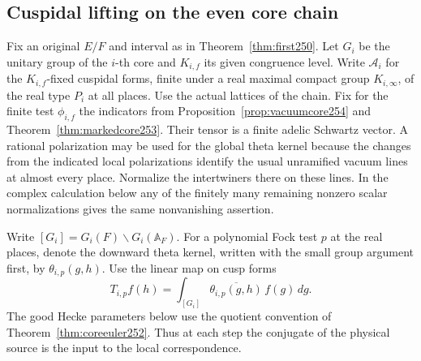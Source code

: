 \documentclass[a4paper,11pt]{article}
\theoremstyle{definition}
\theoremstyle{remark}
\numberwithin{equation}{section}
\begin{document}
\subsection{Cuspidal lifting on the even core chain}\label{nav:IV-34}
Fix an original \(E/F\) and interval as in Theorem~\ref{thm:first250}.
Let \(G_i\) be the unitary group of the \(i\)-th core and \(K_{i,f}\)
its given congruence level. Write \(\mathcal A_i\) for the
\(K_{i,f}\)-fixed cuspidal forms, finite under a real maximal
compact group \(K_{i,\infty}\), of the real type \(P_i\) at all
places. Use the actual lattices of the chain. Fix for the finite
test \(\phi_{i,f}\) the indicators from
Proposition~\ref{prop:vacuumcore254} and
Theorem~\ref{thm:markedcore253}. Their tensor is a finite adelic
Schwartz vector. A rational polarization may be used for the
global theta kernel because the changes from the indicated local
polarizations identify the usual unramified vacuum lines at
almost every place. Normalize the intertwiners there on these
lines. In the complex calculation below any of the finitely
many remaining nonzero scalar normalizations gives the same
nonvanishing assertion.

Write \([G_i]=G_i(F)\backslash G_i(\mathbb A_F)\).
For a polynomial Fock test \(p\) at the real places, denote
the downward theta kernel, written with the small group argument
first, by \(\theta_{i,p}(g,h)\). Use the linear map on cusp forms
\[
   T_{i,p}f(h)=\int_{[G_i]}\overline{\theta_{i,p}(g,h)}\,f(g)\,dg .
\]
The good Hecke parameters below use the quotient convention of
Theorem~\ref{thm:coreeuler252}. Thus at each step the conjugate
of the physical source is the input to the local correspondence.
\end{document}
